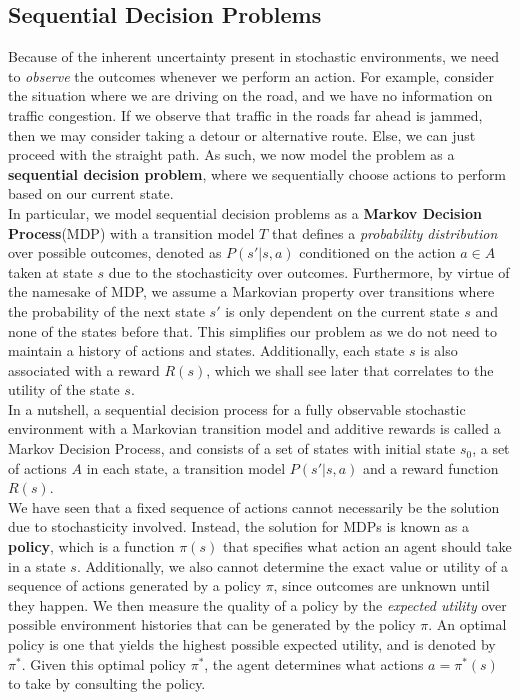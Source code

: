\documentclass[11pt]{article}
\begin{document}
\subsection{Sequential Decision Problems}

Because of the inherent uncertainty present in stochastic environments, we need to \textit{observe} the outcomes whenever we perform an action. For example, consider the situation where we are driving on the road, and we have no information on traffic congestion. If we observe that traffic in the roads far ahead is jammed, then we may consider taking a detour or alternative route. Else, we can just proceed with the straight path. As such, we now model the problem as a \textbf{sequential decision problem}, where we sequentially choose actions to perform based on our current state.\\

In particular, we model sequential decision problems as a \textbf{Markov Decision Process}(MDP) with a transition model $T$ that defines a \textit{probability distribution} over possible outcomes, denoted as $P(s'|s, a)$ conditioned on the action $a \in A$ taken at state $s$ due to the stochasticity over outcomes. Furthermore, by virtue of the namesake of MDP, we assume a Markovian property over transitions where the probability of the next state $s'$ is only dependent on the current state $s$ and none of the states before that. This simplifies our problem as we do not need to maintain a history of actions and states. Additionally, each state $s$ is also associated with a reward $R(s)$, which we shall see later that correlates to the utility of the state $s$.\\

In a nutshell, a sequential decision process for a fully observable stochastic environment with a Markovian transition model and additive rewards is called a Markov Decision Process, and consists of a set of states with initial state $s_0$, a set of actions $A$ in each state, a transition model $P(s' | s, a)$ and a reward function $R(s)$.\\

We have seen that a fixed sequence of actions cannot necessarily be the solution due to stochasticity involved. Instead, the solution for MDPs is known as a \textbf{policy}, which is a function $\pi(s)$ that specifies what action an agent should take in a state $s$. Additionally, we also cannot determine the exact value or utility of a sequence of actions generated by a policy $\pi$, since outcomes are unknown until they happen. We then measure the quality of a policy by the \textit{expected utility} over possible environment histories that can be generated by the policy $\pi$. An optimal policy is one that yields the highest possible expected utility, and is denoted by $\pi^*$. Given this optimal policy $\pi^*$, the agent determines what actions $a = \pi^*(s)$ to take by consulting the policy. 
\end{document}
